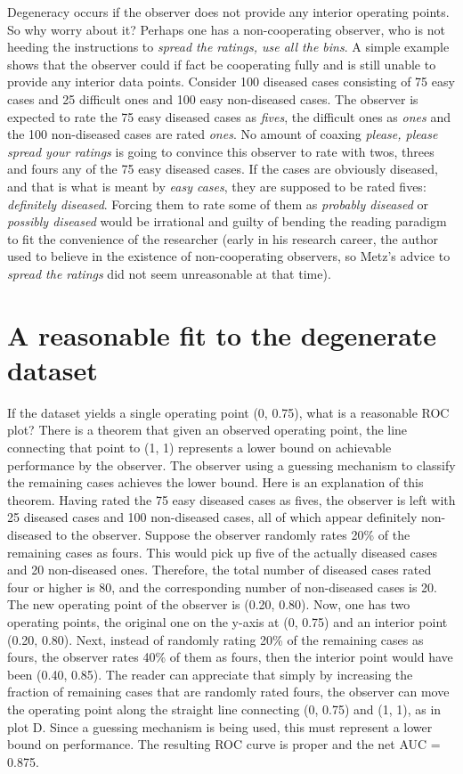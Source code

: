 \documentclass[]{book}
\begin{document}
Degeneracy occurs if the observer does not provide any interior operating points. So why worry about it? Perhaps one has a non-cooperating observer, who is not heeding the instructions to \emph{spread the ratings, use all the bins}. A simple example shows that the observer could if fact be cooperating fully and is still unable to provide any interior data points. Consider 100 diseased cases consisting of 75 easy cases and 25 difficult ones and 100 easy non-diseased cases. The observer is expected to rate the 75 easy diseased cases as \emph{fives}, the difficult ones as \emph{ones} and the 100 non-diseased cases are rated \emph{ones}. No amount of coaxing \emph{please, please spread your ratings} is going to convince this observer to rate with twos, threes and fours any of the 75 easy diseased cases. If the cases are obviously diseased, and that is what is meant by \emph{easy cases}, they are supposed to be rated fives: \emph{definitely diseased}. Forcing them to rate some of them as \emph{probably diseased} or \emph{possibly diseased} would be irrational and guilty of bending the reading paradigm to fit the convenience of the researcher (early in his research career, the author used to believe in the existence of non-cooperating observers, so Metz's advice to \emph{spread the ratings} did not seem unreasonable at that time).

\hypertarget{a-reasonable-fit-to-the-degenerate-dataset}{%
\section{A reasonable fit to the degenerate dataset}\label{a-reasonable-fit-to-the-degenerate-dataset}}

If the dataset yields a single operating point (0, 0.75), what is a reasonable ROC plot? There is a theorem that given an observed operating point, the line connecting that point to (1, 1) represents a lower bound on achievable performance by the observer. The observer using a guessing mechanism to classify the remaining cases achieves the lower bound. Here is an explanation of this theorem. Having rated the 75 easy diseased cases as fives, the observer is left with 25 diseased cases and 100 non-diseased cases, all of which appear definitely non-diseased to the observer. Suppose the observer randomly rates 20\% of the remaining cases as fours. This would pick up five of the actually diseased cases and 20 non-diseased ones. Therefore, the total number of diseased cases rated four or higher is 80, and the corresponding number of non-diseased cases is 20. The new operating point of the observer is (0.20, 0.80). Now, one has two operating points, the original one on the y-axis at (0, 0.75) and an interior point (0.20, 0.80). Next, instead of randomly rating 20\% of the remaining cases as fours, the observer rates 40\% of them as fours, then the interior point would have been (0.40, 0.85). The reader can appreciate that simply by increasing the fraction of remaining cases that are randomly rated fours, the observer can move the operating point along the straight line connecting (0, 0.75) and (1, 1), as in plot D. Since a guessing mechanism is being used, this must represent a lower bound on performance. The resulting ROC curve is proper and the net AUC = 0.875.
\end{document}
